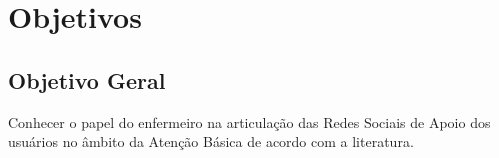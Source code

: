 \chapter{Objetivos}
\label{sec:objetivos}

\section{Objetivo Geral}
\label{sec:objetivo-geral}

Conhecer o papel do enfermeiro na articulação das Redes Sociais de Apoio dos usuários no âmbito da Atenção Básica de acordo com a literatura.


